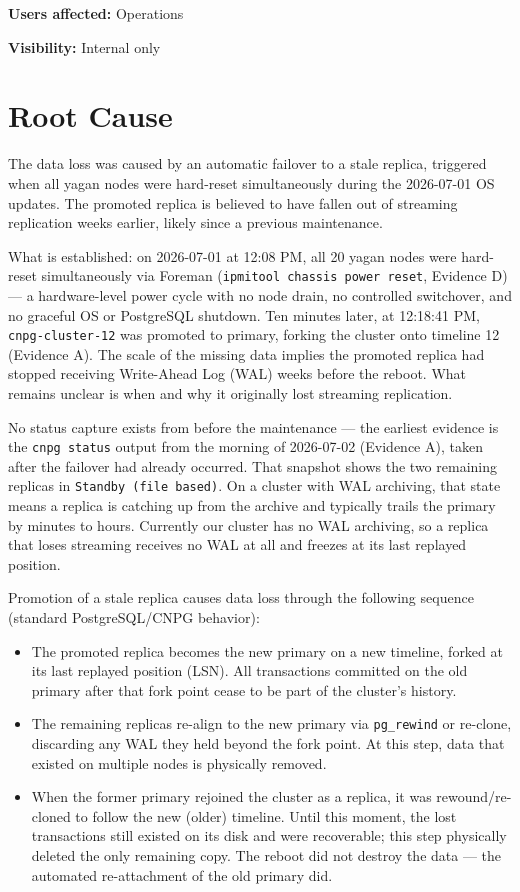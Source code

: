 \documentclass[PMO,authoryear,toc]{lsstdoc}
\begin{document}
\textbf{Users affected:} Operations

\textbf{Visibility:} Internal only

\section{Root Cause}

The data loss was caused by an automatic failover to a stale replica,
triggered when all yagan nodes were hard-reset simultaneously during the
2026-07-01 OS updates. The promoted replica is believed to have fallen out of
streaming replication weeks earlier, likely since a previous maintenance.

What is established: on 2026-07-01 at 12:08 PM, all 20 yagan nodes were
hard-reset simultaneously via Foreman (\texttt{ipmitool chassis power reset},
Evidence D) --- a hardware-level power cycle with no node drain, no controlled
switchover, and no graceful OS or PostgreSQL shutdown. Ten minutes later, at
12:18:41 PM, \texttt{cnpg-cluster-12} was promoted to primary, forking the
cluster onto timeline 12 (Evidence A). The scale of the missing data implies
the promoted replica had stopped receiving Write-Ahead Log (WAL) weeks before
the reboot. What remains unclear is when and why it originally lost streaming
replication.

No status capture exists from before the maintenance --- the earliest evidence
is the \texttt{cnpg status} output from the morning of 2026-07-02 (Evidence
A), taken after the failover had already occurred. That snapshot shows the two
remaining replicas in \texttt{Standby (file based)}. On a cluster with WAL
archiving, that state means a replica is catching up from the archive and
typically trails the primary by minutes to hours. Currently our cluster has no
WAL archiving, so a replica that loses streaming receives no WAL at all and
freezes at its last replayed position.

Promotion of a stale replica causes data loss through the following sequence
(standard PostgreSQL/CNPG behavior):

\begin{itemize}
  \item The promoted replica becomes the new primary on a new timeline, forked
        at its last replayed position (LSN). All transactions committed on the
        old primary after that fork point cease to be part of the cluster's
        history.
  \item The remaining replicas re-align to the new primary via
        \texttt{pg\_rewind} or re-clone, discarding any WAL they held beyond
        the fork point. At this step, data that existed on multiple nodes is
        physically removed.
  \item When the former primary rejoined the cluster as a replica, it was
        rewound/re-cloned to follow the new (older) timeline. Until this
        moment, the lost transactions still existed on its disk and were
        recoverable; this step physically deleted the only remaining copy. The
        reboot did not destroy the data --- the automated re-attachment of the
        old primary did.
\end{itemize}
\end{document}
